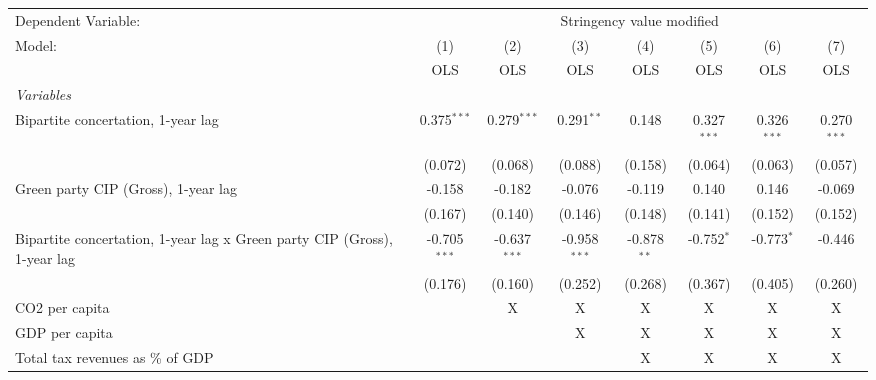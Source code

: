
\begingroup
\centering
\begin{tabular}{lccccccc}
   \toprule
   Dependent Variable: & \multicolumn{7}{c}{Stringency value modified}\\
   Model:                                                                   & (1)            & (2)            & (3)            & (4)           & (5)           & (6)           & (7)\\  
                                                                            &  OLS           & OLS            & OLS            & OLS           & OLS           & OLS           & OLS\\  
   \midrule
   \emph{Variables}\\
   Bipartite concertation, 1-year lag                                       & 0.375$^{***}$  & 0.279$^{***}$  & 0.291$^{**}$   & 0.148         & 0.327$^{***}$ & 0.326$^{***}$ & 0.270$^{***}$\\   
                                                                            & (0.072)        & (0.068)        & (0.088)        & (0.158)       & (0.064)       & (0.063)       & (0.057)\\   
   Green party CIP (Gross), 1-year lag                                      & -0.158         & -0.182         & -0.076         & -0.119        & 0.140         & 0.146         & -0.069\\   
                                                                            & (0.167)        & (0.140)        & (0.146)        & (0.148)       & (0.141)       & (0.152)       & (0.152)\\   
   Bipartite concertation, 1-year lag x Green party CIP (Gross), 1-year lag & -0.705$^{***}$ & -0.637$^{***}$ & -0.958$^{***}$ & -0.878$^{**}$ & -0.752$^{*}$  & -0.773$^{*}$  & -0.446\\   
                                                                            & (0.176)        & (0.160)        & (0.252)        & (0.268)       & (0.367)       & (0.405)       & (0.260)\\   
   CO2 per capita                                                           &                & X              & X              & X             & X             & X             & X\\  
   GDP per capita                                                           &                &                & X              & X             & X             & X             & X\\  
   Total tax revenues as \% of GDP                                          &                &                &                & X             & X             & X             & X\\  

\end{tabular}

